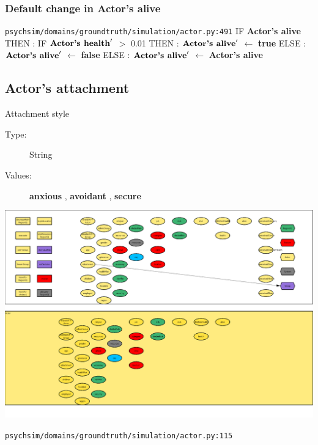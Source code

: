 \documentclass{article}%
\begin{document}
\subsubsection{Default change in Actor's alive}%
\label{ssubsec:Default change in Actor's alive}%
\begin{flushleft}%
\verb|psychsim/domains/groundtruth/simulation/actor.py:491|%
\linebreak%
IF %
\textbf{Actor's alive}%
\linebreak%
\hspace*{2em}%
THEN %
: %
IF %
$\mbox{\textbf{Actor's health}} '$%
$>$%
0.01%
\linebreak%
\hspace*{4em}%
THEN %
: %
$\mbox{\textbf{Actor's alive}} '$%
$\leftarrow$%
\textbf{true}%
\linebreak%
\hspace*{4em}%
ELSE %
: %
$\mbox{\textbf{Actor's alive}} '$%
$\leftarrow$%
\textbf{false}%
\linebreak%
\hspace*{2em}%
ELSE %
: %
$\mbox{\textbf{Actor's alive}} '$%
$\leftarrow$%
\textbf{Actor's alive}%
\end{flushleft}

%
\subsection{Actor's attachment}%
\label{subsec:Actor's attachment}%
Attachment style%
\begin{description}%
\item[Type:]%
String%
\item[Values:]%
\textbf{anxious}%
, %
\textbf{avoidant}%
, %
\textbf{secure}%
\end{description}%
\includegraphics[width=\textwidth]{images/attachmentOfActor.png}%
\begin{flushleft}%
\verb|psychsim/domains/groundtruth/simulation/actor.py:115|%
\end{flushleft}
\end{document}
